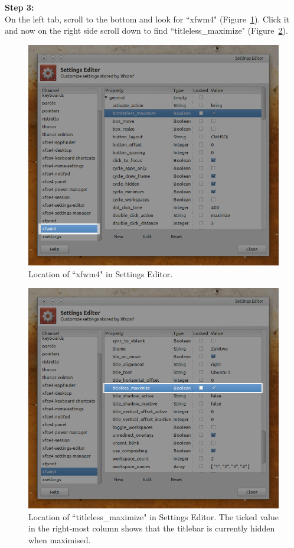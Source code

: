 \documentclass[12pt, a4paper]{article}
\begin{document}
\noindent \textbf{Step 3:}\\

\noindent On the left tab, scroll to the bottom and look for ``xfwm4" (Figure~\ref{fig4}). Click it and now on the right side scroll down to find ``titleless\_maximize" (Figure~\ref{fig5}).

\begin{figure}[h]
  \centering
  \includegraphics[width=1\textwidth]{imgs/4settingseditor.png}
  \caption{Location of ``xfwm4" in Settings Editor.}
  \label{fig4}
\end{figure}

\begin{figure}[h]
  \centering
  \includegraphics[width=1\textwidth]{imgs/5titlelessmaximise.png}
  \caption{Location of ``titleless\_maximize" in Settings Editor. The ticked value in the right-most column shows that the titlebar is currently hidden when maximised.}
  \label{fig5}
\end{figure}
\end{document}
